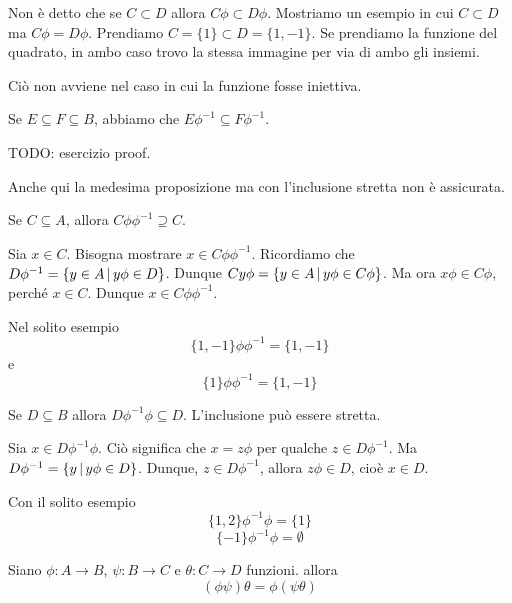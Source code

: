 \documentclass[a4paper]{article}
\begin{document}
Non è detto che se \(C \subset D\) allora \(C\phi \subset D\phi\).
Mostriamo un esempio in cui \(C \subset D\) ma \(C\phi = D\phi\).
Prendiamo \(C=\{1\} \subset D=\{1,-1\}\). Se prendiamo la funzione del quadrato, in ambo caso
trovo la stessa immagine per via di ambo gli insiemi.

Ciò non avviene nel caso in cui la funzione fosse iniettiva.

\begin{snippetproposition}{}
    Se \(E\subseteq F \subseteq B\), abbiamo che \(E\phi^{-1} \subseteq F\phi^{-1}\).
\end{snippetproposition}

TODO: esercizio proof.

Anche qui la medesima proposizione ma con l'inclusione stretta non è assicurata.

\begin{snippetproposition}{}
    Se \(C\subseteq A\), allora \(C\phi \phi^{-1} \supseteq C\).
\end{snippetproposition}

\begin{snippetproof}{}
    Sia \(x \in C\). Bisogna mostrare \(x\in C\phi\phi^{-1}\).
    Ricordiamo che \(D\phi^{-1} = \{ y \in A \,|\, y\phi \in D \}\). Dunque
    \(Cy\phi = \{ y \in A \,|\, y\phi \in C\phi \}\). Ma ora \(x\phi \in C\phi\),
    perché \(x\in C\). Dunque \(x \in C\phi\phi^{-1}\).
\end{snippetproof}

Nel solito esempio
\[
    \{1,-1\}\phi\phi^{-1} = \{1,-1\}   
\]
e
\[
    \{1\}\phi\phi^{-1} = \{1,-1\}   
\]

\begin{snippetproposition}{}
    Se \(D\subseteq B\) allora \(D\phi^{-1}\phi \subseteq D\). L'inclusione può essere stretta.
\end{snippetproposition}
\begin{snippetproof}{}
    Sia \(x\in D\phi^{-1}\phi\). Ciò significa che \(x = z\phi \)
    per qualche \(z\in D\phi^{-1}\). Ma \(D\phi^{-1} = \{y\,|\, y\phi \in D\}\).
    Dunque, \(z\in D\phi^{-1}\), allora \(z\phi \in D\), cioè \(x\in D\).
\end{snippetproof}

Con il solito esempio
\[
    \{1,2\}\phi^{-1}\phi = \{1\}
\]
\[
    \{-1\}\phi^{-1}\phi = \emptyset
\]

\begin{snippetproposition}{}
    Siano \(\phi \colon A \to B\), \(\psi\colon B\to C\) e \(\theta \colon C \to D\) funzioni.
    allora
    \[
        (\phi\psi)\theta = \phi(\psi\theta)
    \]
\end{snippetproposition}
\end{document}
